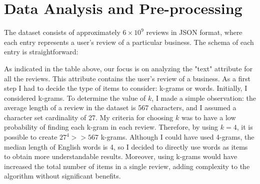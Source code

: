 \section{Data Analysis and Pre-processing}
\label{data-analysis}

The dataset consists of approximately $6 \times 10^9$ reviews in JSON format, where each entry represents a user's review of a particular business. The schema of each entry is straightforward:

\begin{center}
\end{center}

As indicated in the table above, our focus is on analyzing the "text" attribute for all the reviews. This attribute contains the user's review of a business. As a first step I had to decide the type of items to consider: k-grams or words. Initially, I considered k-grams. To determine the value of $k$, I made a simple observation: the average length of a review in the dataset is 567 characters, and I assumed a character set cardinality of 27. My criteria for choosing $k$ was to have a low probability of finding each k-gram in each review. Therefore, by using $k = 4$, it is possible to create $27^4 >> 567$ k-grams. Although I could have used 4-grams, the median length of English words is 4, so I decided to directly use words as items to obtain more understandable results. Moreover, using k-grams would have increased the total number of items in a single review, adding complexity to the algorithm without significant benefits.

